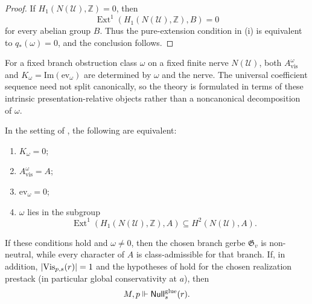 \begin{proof}
If $H_1(N(\mathcal U),\mathbb Z)=0$, then
\[
\operatorname{Ext}^1(H_1(N(\mathcal U),\mathbb Z),B)=0
\]
for every abelian group $B$. Thus the pure-extension condition in (i) is equivalent to $q_*(\omega)=0$, and the conclusion follows.
\end{proof}

\begin{remark}\label{rem:no-canonical-splitting}
For a fixed branch obstruction class $\omega$ on a fixed finite nerve $N(\mathcal U)$, both $A_{\mathrm{vis}}^{\omega}$ and $K_{\omega}=\mathrm{Im}(\mathrm{ev}_{\omega})$ are determined by $\omega$ and the nerve. The universal coefficient sequence need not split canonically, so the theory is formulated in terms of these intrinsic presentation-relative objects rather than a noncanonical decomposition of $\omega$.
\end{remark}

\begin{proposition}\label{thm:character-blind-obstructions}
In the setting of , the following are equivalent:
\begin{enumerate}[label=(\roman*),nosep]
\item $K_{\omega}=0$;
\item $A_{\mathrm{vis}}^{\omega}=A$;
\item $\mathrm{ev}_{\omega}=0$;
\item $\omega$ lies in the subgroup
\[
\operatorname{Ext}^1(H_1(N(\mathcal U),\mathbb Z),A)\subseteq H^2(N(\mathcal U),A).
\]
\end{enumerate}
If these conditions hold and $\omega\neq 0$, then the chosen branch gerbe $\mathfrak G_v$ is non-neutral, while every character of $A$ is class-admissible for that branch. If, in addition, $|\mathrm{Vis}_{p,s}(r)|=1$ and the hypotheses of  hold for the chosen realization prestack (in particular global conservativity at $a$), then
\[
M,p\Vdash \mathsf{Null}^{\mathrm{glue}}_s(r).
\]
\end{proposition}

